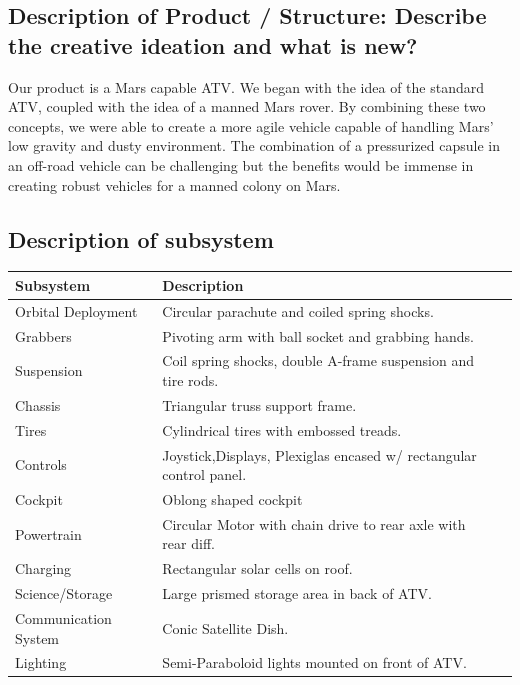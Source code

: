 \subsection{Description of Product / Structure: Describe the creative ideation and what is new?}
Our product is a Mars capable ATV. We began with the idea of the standard ATV, coupled with the idea of a manned Mars rover. By combining these two concepts, we were able to create a more agile vehicle capable of handling Mars’ low gravity and dusty environment. The combination of a pressurized capsule in an off-road vehicle can be challenging but the benefits would be immense in creating robust vehicles for a manned colony on Mars.

\subsection{Description of subsystem}

\begin{center}
\begin{tabular}{lll}
\hline
Subsystem & Description\\
\hline
Orbital Deployment & Circular parachute and coiled spring shocks.\\
Grabbers & Pivoting arm with ball socket and grabbing hands.\\
Suspension & Coil spring shocks, double A-frame suspension and tire rods.\\
Chassis & Triangular truss support frame. \\
Tires & Cylindrical tires with embossed treads. \\
Controls & Joystick,Displays, Plexiglas encased w/ rectangular control panel.\\
Cockpit & Oblong shaped cockpit \\
Powertrain & Circular Motor with chain drive to rear axle with rear diff.\\
Charging & Rectangular solar cells on roof. \\
Science/Storage & Large prismed storage area in back of ATV. \\
Communication System & Conic Satellite Dish. \\
Lighting & Semi-Paraboloid lights mounted on front of ATV. \\
\hline
\end{tabular}
\end{center}

